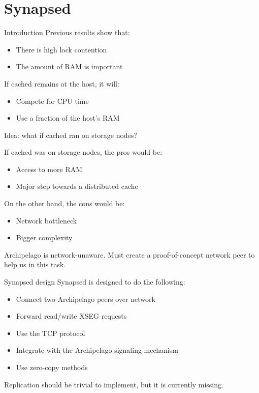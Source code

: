 \section{Synapsed}

\begin{frame}{Introduction}
	Previous results show that:
	\begin{itemize}
		\item There is high lock contention
		\item The amount of RAM is important
	\end{itemize}
	\dspc
	If cached remains at the host, it will:
	\begin{itemize}
		\item Compete for CPU time
		\item Use a fraction of the host's RAM
	\end{itemize}
	\dspc
	Idea: what if cached ran on storage nodes?
\end{frame}

\begin{frame}
	If cached was on storage nodes, the pros would be:
	\begin{itemize}
		\item Access to more RAM
		\item Major step towards a distributed cache
	\end{itemize}
	\dspc
	On the other hand, the cons would be:
	\begin{itemize}
		\item Network bottleneck
		\item Bigger complexity
	\end{itemize}
	\dspc
	Archipelago is network-unaware. Must create a proof-of-concept network peer 
	to help us in this task.
\end{frame}

\begin{frame}{Synapsed design}
	Synapsed is designed to do the following:
	\begin{itemize}
		\item Connect two Archipelago peers over network
		\item Forward read/write XSEG requests
		\item Use the TCP protocol
		\item Integrate with the Archipelago signaling mechanism
		\item Use zero-copy methods
	\end{itemize}
	\dspc
	Replication should be trivial to implement, but it is currently missing.
\end{frame}

